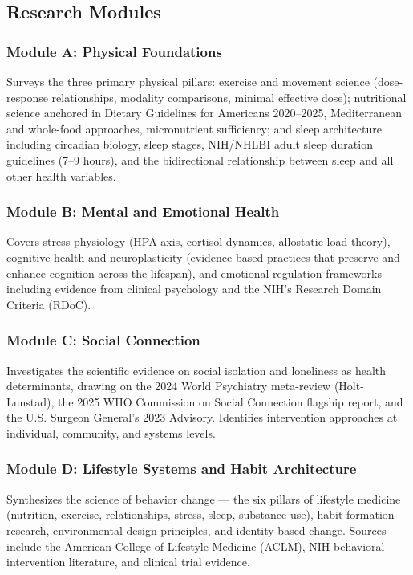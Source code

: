 \documentclass[11pt,letterpaper]{article}
\begin{document}
\subsection{Research Modules}

\subsubsection{Module A: Physical Foundations}
Surveys the three primary physical pillars: exercise and movement science (dose-response relationships, modality comparisons, minimal effective dose); nutritional science anchored in Dietary Guidelines for Americans 2020--2025, Mediterranean and whole-food approaches, micronutrient sufficiency; and sleep architecture including circadian biology, sleep stages, NIH/NHLBI adult sleep duration guidelines (7--9 hours), and the bidirectional relationship between sleep and all other health variables.

\subsubsection{Module B: Mental and Emotional Health}
Covers stress physiology (HPA axis, cortisol dynamics, allostatic load theory), cognitive health and neuroplasticity (evidence-based practices that preserve and enhance cognition across the lifespan), and emotional regulation frameworks including evidence from clinical psychology and the NIH's Research Domain Criteria (RDoC).

\subsubsection{Module C: Social Connection}
Investigates the scientific evidence on social isolation and loneliness as health determinants, drawing on the 2024 World Psychiatry meta-review (Holt-Lunstad), the 2025 WHO Commission on Social Connection flagship report, and the U.S. Surgeon General's 2023 Advisory. Identifies intervention approaches at individual, community, and systems levels.

\subsubsection{Module D: Lifestyle Systems and Habit Architecture}
Synthesizes the science of behavior change --- the six pillars of lifestyle medicine (nutrition, exercise, relationships, stress, sleep, substance use), habit formation research, environmental design principles, and identity-based change. Sources include the American College of Lifestyle Medicine (ACLM), NIH behavioral intervention literature, and clinical trial evidence.
\end{document}
